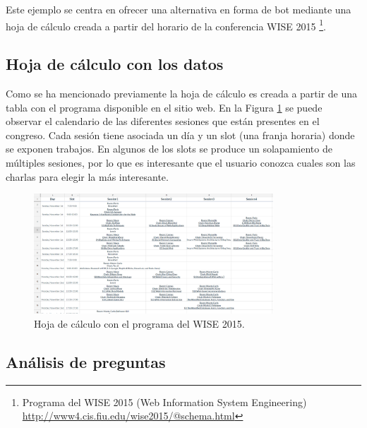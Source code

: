 Este ejemplo se centra en ofrecer una alternativa en forma de bot mediante una hoja de cálculo creada a partir del horario de la conferencia WISE 2015 \footnote{Programa del WISE 2015 (Web Information System Engineering) \url{http://www4.cis.fiu.edu/wise2015/@schema.html}}.

\subsection{Hoja de cálculo con los datos}

Como se ha mencionado previamente la hoja de cálculo es creada a partir de una tabla con el programa disponible en el sitio web. En la Figura \ref{fig:SheetConference} se puede observar el calendario de las diferentes sesiones que están presentes en el congreso. Cada sesión tiene asociada un día y un slot (una franja horaria) donde se exponen trabajos. En algunos de los slots se produce un solapamiento de múltiples sesiones, por lo que es interesante que el usuario conozca cuales son las charlas para elegir la más interesante.

\begin{figure}[htb]
	\centering
	\includegraphics[width=0.8\textwidth]{./figs/sheetConference.png}
	\caption{Hoja de cálculo con el programa del WISE 2015.}
	\label{fig:SheetConference}
\end{figure}

\subsection{Análisis de preguntas}

